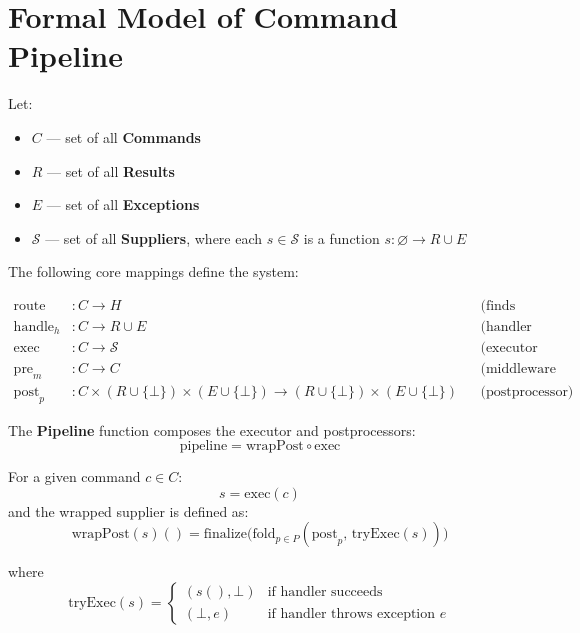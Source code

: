 \documentclass{article}
\begin{document}
\section*{Formal Model of Command Pipeline}

Let:
\begin{itemize}
    \item $C$ --- set of all \textbf{Commands}
    \item $R$ --- set of all \textbf{Results}
    \item $E$ --- set of all \textbf{Exceptions}
    \item $\mathcal{S}$ --- set of all \textbf{Suppliers}, where each $s \in \mathcal{S}$ is a function $s: \varnothing \to R \cup E$
\end{itemize}

\vspace{1em}
\noindent
The following core mappings define the system:

\[
\begin{aligned}
\text{route} &: C \to H && \text{(finds appropriate handler)} \\
\text{handle}_h &: C \to R \cup E && \text{(handler executes logic)} \\
\text{exec} &: C \to \mathcal{S} && \text{(executor produces deferred computation)} \\
\text{pre}_m &: C \to C && \text{(middleware transformation)} \\
\text{post}_p &: C \times (R \cup \{\bot\}) \times (E \cup \{\bot\}) \to (R \cup \{\bot\}) \times (E \cup \{\bot\}) && \text{(postprocessor)}
\end{aligned}
\]

\vspace{1em}
\noindent
The \textbf{Pipeline} function composes the executor and postprocessors:
\[
\mathrm{pipeline} = \mathrm{wrapPost} \circ \mathrm{exec}
\]

\vspace{0.5em}
\noindent
For a given command $c \in C$:
\[
s = \mathrm{exec}(c)
\]
and the wrapped supplier is defined as:
\[
\mathrm{wrapPost}(s)() =
\mathrm{finalize}\big(
    \mathrm{fold}_{p \in P}(\mathrm{post}_p,\, \mathrm{tryExec}(s))
\big)
\]

where
\[
\mathrm{tryExec}(s) =
\begin{cases}
    (s(), \bot) & \text{if handler succeeds}\\[4pt]
    (\bot, e) & \text{if handler throws exception } e
\end{cases}
\]
\end{document}
